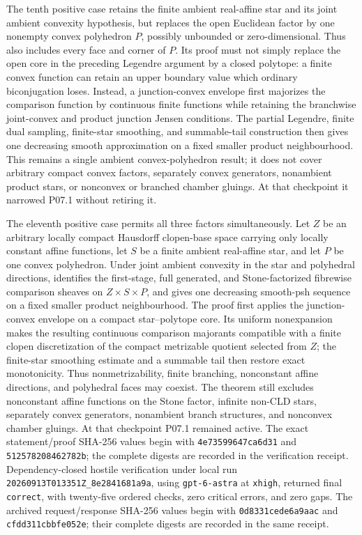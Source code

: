 The tenth positive case retains the finite ambient real-affine star and its
joint ambient convexity hypothesis, but replaces the open Euclidean factor
by one nonempty convex polyhedron \(P\), possibly unbounded or
zero-dimensional.  Thus 
also includes every face and corner of \(P\).  Its proof must not simply
replace the open core in the preceding Legendre argument by a closed
polytope: a finite convex function can retain an upper boundary value which
ordinary biconjugation loses.  Instead, a junction-convex envelope first
majorizes the comparison function by continuous finite functions while
retaining the branchwise joint-convex and product junction Jensen
conditions.  The partial Legendre, finite dual sampling, finite-star
smoothing, and summable-tail construction then gives one decreasing smooth
approximation on a fixed smaller product neighbourhood.  This remains a
single ambient convex-polyhedron result; it does not cover arbitrary compact
convex factors, separately convex generators, nonambient product stars, or
nonconvex or branched chamber gluings.  At that checkpoint it narrowed P07.1 without retiring it.

The eleventh positive case permits all three factors simultaneously.  Let
\(Z\) be an arbitrary locally compact Hausdorff clopen-base space carrying
only locally constant affine functions, let \(S\) be a finite ambient
real-affine star, and let \(P\) be one convex polyhedron.  Under joint
ambient convexity in the star and polyhedral directions,
 identifies the
first-stage, full generated, and Stone-factorized fibrewise comparison
sheaves on \(Z\times S\times P\), and gives one decreasing smooth-psh
sequence on a fixed smaller product neighbourhood.  The proof first applies
the junction-convex envelope on a compact star--polytope core.  Its uniform
nonexpansion makes the resulting continuous comparison majorants compatible
with a finite clopen discretization of the compact metrizable quotient
selected from \(Z\); the finite-star smoothing estimate and a summable tail
then restore exact monotonicity.  Thus nonmetrizability, finite branching,
nonconstant affine directions, and polyhedral faces may coexist.  The
theorem still excludes nonconstant affine functions on the Stone factor,
infinite non-CLD stars, separately convex generators, nonambient branch
structures, and nonconvex chamber gluings.  At that checkpoint P07.1 remained active.
The exact statement/proof SHA-256 values begin with
\texttt{4e73599647ca6d31} and \texttt{512578208462782b}; the complete
digests are recorded in the verification receipt.
Dependency-closed hostile verification under local run
\nolinkurl{20260913T013351Z_8e2841681a9a}, using
\texttt{gpt-6-astra} at \texttt{xhigh}, returned final
\texttt{correct}, with twenty-five ordered checks, zero critical errors,
and zero gaps.  The archived request/response SHA-256 values begin with
\texttt{0d8331cede6a9aac} and \texttt{cfdd311cbbfe052e}; their complete
digests are recorded in the same receipt.

